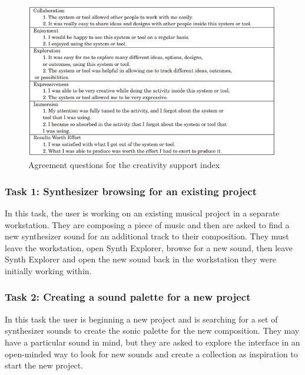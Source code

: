 \begin{figure}[ht]
    \centering
    \includegraphics[width=0.99\textwidth]{figures/synthexplore/CSI-Questions.png}
    \caption{Agreement questions for the creativity support index}
    \label{fig:csi}
\end{figure}

\subsubsection{Task 1: Synthesizer browsing for an existing project}
In this task, the user is working on an existing musical project in a separate workstation. They are composing a piece of music and then are asked to find a new synthesizer sound for an additional track to their composition. They must leave the workstation,
open Synth Explorer, browse for a new sound, then leave Synth Explorer and open the new sound back in the workstation they were initially working within.

\subsubsection{Task 2: Creating a sound palette for a new project}
In this task the user is beginning a new project and is searching for a set of synthesizer sounds to create the sonic palette for the new composition. They may have a particular sound in mind, but they are asked to explore the interface in an open-minded way to look for new sounds and create a collection as inspiration to start the new project.

